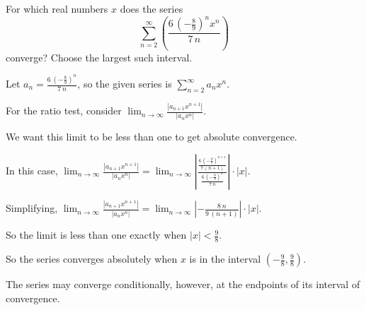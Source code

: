 \documentclass{ximera}
\begin{document}
\begin{question}
  For which real numbers \(x\) does the series \[\displaystyle\sum_{n=2}^\infty \left( \displaystyle\frac{6 \, \left(-\displaystyle\frac{8}{9}\right)^{n} x^{n}}{7 \, n} \right)\] converge?  Choose the largest such interval.
  
  \begin{solution}
    \begin{hint}
      Let \(a_{n} = \displaystyle\frac{6 \, \left(-\displaystyle\frac{8}{9}\right)^{n}}{7 \, n}\), so the given series is \(\displaystyle\sum_{n=2}^\infty a_{n} x^{n}\).
    \end{hint}
    \begin{hint}
      For the ratio test, consider \(\lim_{n \to \infty} \displaystyle\frac{|a_{n+1} x^{n+1}|}{|a_{n} x^{n}|}\).
    \end{hint}
    \begin{hint}
      We want this limit to be less than one to get absolute convergence.
    \end{hint}
    \begin{hint}
      In this case, \(\lim_{n \to \infty} \displaystyle\frac{|a_{n+1} x^{n+1}|}{|a_{n} x^{n}|} = \lim_{n \to \infty} \left| \displaystyle\frac{\displaystyle\frac{6 \, \left(-\displaystyle\frac{8}{9}\right)^{n + 1}}{7 \, {\left(n + 1\right)}}}{\displaystyle\frac{6 \, \left(-\displaystyle\frac{8}{9}\right)^{n}}{7 \, n}} \right| \cdot \left| x \right|\).
    \end{hint}
    \begin{hint}
      Simplifying, \(\lim_{n \to \infty} \displaystyle\frac{|a_{n+1} x^{n+1}|}{|a_{n} x^{n}|} = \lim_{n \to \infty} \left| -\displaystyle\frac{8 \, n}{9 \, {\left(n + 1\right)}} \right| \cdot \left| x \right|\).
    \end{hint}
    \begin{hint}
      So the limit is less than one exactly when \(|x| < \displaystyle\frac{9}{8}\).
    \end{hint}
    \begin{hint}
      So the series converges absolutely when \(x\) is in the interval \(\left(-\displaystyle\frac{9}{8},\displaystyle\frac{9}{8}\right)\).
    \end{hint}
    \begin{hint}
      The series may converge conditionally, however, at the endpoints of its interval of convergence.
    \end{hint}
    \begin{hint}

\end{hint}
\end{solution}
\end{question}
\end{document}
